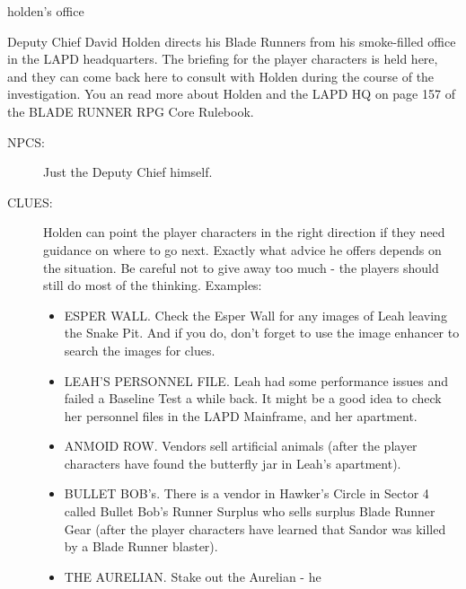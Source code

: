 \documentclass{book}
\begin{document}
	\begin{locationbox}{holden's office}
		\begin{multicols}{2}
		Deputy Chief David Holden directs his Blade Runners from his
		smoke-filled office in the LAPD headquarters. The briefing for
		the player characters is held here, and they can come back here
		to consult with Holden during the course of the investigation.
		You an read more about Holden and the LAPD HQ on page 157 of the
		BLADE RUNNER RPG Core Rulebook.
		\begin{description}
			\item[\color{titlered}\textsf{NPCS:}]Just the Deputy Chief himself.
			\item[\color{titlered}\textsf{CLUES:}] Holden can point the
				player characters in the right direction if they
				need guidance on where to go next. Exactly what
				advice he offers depends on the situation. Be
				careful not to give away too much - the players
				should still do most of the thinking. Examples:
				\begin{itemize}
					\item[\color{titlered}{$\blackinwhitesquare$}]
						{\color{titlered}ESPER WALL.}
						Check the Esper Wall for any images of Leah leaving
						the Snake Pit. And if you do,
						don't forget to use the image
						enhancer to search the images
						for clues.
					\item[\color{titlered}{$\blackinwhitesquare$}]
						{\color{titlered}LEAH'S
						PERSONNEL FILE. }
						Leah had some performance issues
						and failed a Baseline Test a
						while back. It might be a good
						idea to check her personnel
						files in the LAPD Mainframe, and
						her apartment.
					\item[\color{titlered}{$\blackinwhitesquare$}]
						{\color{titlered}ANMOID ROW.
						}
						Vendors sell artificial animals
						(after the player characters
						have found the butterfly jar in 
						Leah's apartment).
					\item[\color{titlered}{$\blackinwhitesquare$}]
						{\color{titlered} BULLET
						BOB's. }
						There is a vendor in Hawker's
						Circle in Sector 4 called Bullet
						Bob's Runner Surplus who sells
						surplus Blade Runner Gear (after
						the player characters
						have learned that Sandor
						was killed by a Blade
						Runner blaster).
					\item[\color{titlered}{$\blackinwhitesquare$}]
						{\color{titlered} THE
						AURELIAN. }
						Stake out the Aurelian - he

\end{itemize}
\end{description}
\end{multicols}
\end{locationbox}
\end{document}
